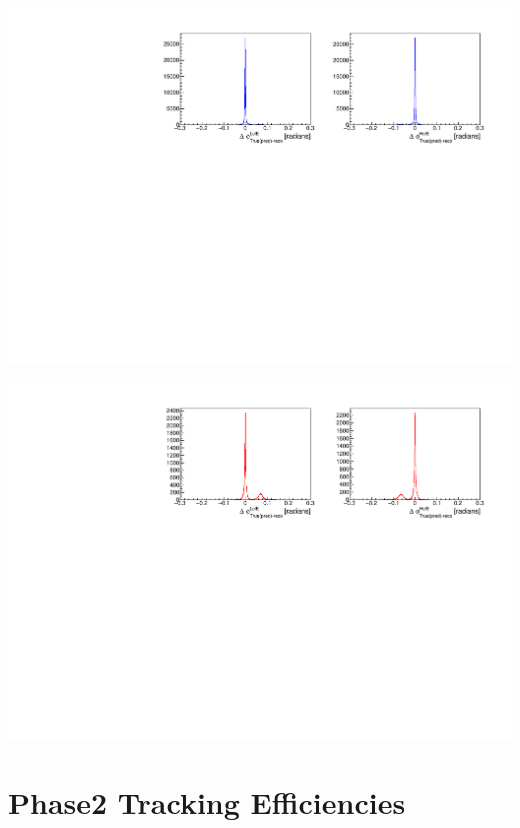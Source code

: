 \documentclass[8pt]{beamer}
\begin{document}
\begin{frame}
	\includegraphics[width=\textwidth]{VBilder/b2b_DataP3}
	
	\includegraphics[width=\textwidth]{VBilder/b2b_MCP3}
\end{frame}






\section{Phase2 Tracking Efficiencies}
\end{document}
